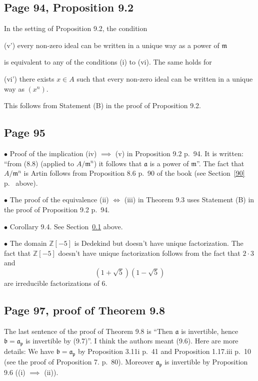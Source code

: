 \documentclass[parskip=half,fontsize=12pt]{scrartcl}%
\newcommand{\mf}{\mathfrak}
\newcommand{\ppp}{\mf p}
\newcommand{\bu}{\bullet}
\begin{document}
\subsection{Page 94, Proposition 9.2}\label{92}%

In the setting of Proposition 9.2, the condition

(v') every non-zero ideal can be written in a unique way as a power of $\mf m$

is equivalent to any of the conditions (i) to (vi). The same holds for

(vi') there exists $x\in A$ such that every non-zero ideal can be written in a unique way as $(x^n)$.

This follows from Statement (B) in the proof of Proposition 9.2.

\subsection{Page 95}%

$\bu$ Proof of the implication (iv) $\implies$ (v) in Proposition 9.2 p.~94. It is written: ``from (8.8) (applied to $A/\mf m^n$) it follows that $\mf a$ is a power of $\mf m$''. The fact that $A/\mf m^n$ is Artin follows from Proposition 8.6 p.~90 of the book (see Section~\ref{90} p.~\pageref{90} above). %

$\bu$ The proof of the equivalence (ii) $\iff$ (iii) in Theorem 9.3 uses Statement (B) in the proof of Proposition 9.2 p.~94.

$\bu$ Corollary 9.4. See Section~\ref{92} above.

$\bu$ The domain $\mathbb Z[-5]$ is Dedekind but doesn't have unique factorization. %
The fact that $\mathbb Z[-5]$ doesn't have unique factorization follows from the fact that $2\cdot3$ and $$\left(1+\sqrt5\right)\left(1-\sqrt5\right)$$ are irreducible factorizations of $6$.%

\subsection{Page 97, proof of Theorem 9.8}%

The last sentence of the proof of Theorem 9.8 is ``Then $\mf a$ is invertible, hence $\mf b=\mf a_\ppp$ is invertible by (9.7)''. I think the authors meant (9.6). Here are more details: We have $\mf b=\mf a_\ppp$ by Proposition 3.11i p.~41 and Proposition 1.17.iii p.~10 (see the proof of Proposition 7. p.~80). Moreover $\mf a_\ppp$ is invertible by Proposition 9.6 ((i) $\implies$ (ii)). 
\end{document}
